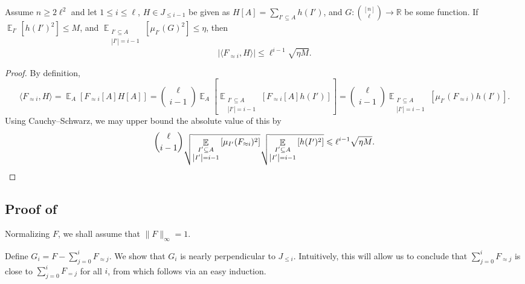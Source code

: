\documentclass{toc}
\newcommand\card[1]{\left| {#1} \right|}
\newcommand\Expect[2]{{\mathop{\mathbb{E}}_{#1}\left[ {#2} \right]}}
\newcommand\norm[1]{\| #1 \|}
\newcommand\inner[2]{\langle{#1},{#2}\rangle}
\renewcommand\geq{\geqslant}
\renewcommand\leq{\leqslant}
\newcommand\lvlfn[2]{{#1}_{={#2}}}
\newcommand\approxlvlfn[2]{{#1}_{\approx{#2}}}
\begin{document}
\begin{claim}\label{claim:approx_almost_ortho}
  Assume $n\geq 2\ell^2$ and let $1\leq i\leq \ell$, $H\in J_{\leq i-1}$ be given as $H[A] = \sum\limits_{I'\subseteq A} h(I')$,
  and $G\colon \binom{[n]}{\ell}\to\mathbb{R}$ be some function. If $\Expect{I'}{h(I')^2}\leq M$, and
  $\Expect{\substack{I'\subseteq A\\ \card{I'} = i-1}}{\mu_{I'}(G)^2}\leq \eta$, then
  \[
  \card{\inner{\approxlvlfn{F}{i}}{H}}\leq \ell^{i-1}\sqrt{\eta M}.
  \]
\end{claim}
\begin{proof}
  By definition,
  \[
  \inner{\approxlvlfn{F}{i}}{H}
  =\Expect{A}{\approxlvlfn{F}{i}[A] H[A]}
  =\binom{\ell}{i-1}\Expect{A}{\Expect{\substack{I'\subseteq A\\ \card{I'} = i-1}}{\approxlvlfn{F}{i}[A]h(I')}}
  =\binom{\ell}{i-1}\Expect{\substack{I'\subseteq A\\ \card{I'} = i-1}}{\mu_{I'}(\approxlvlfn{F}{i})h(I')}.
  \]
  Using Cauchy--Schwarz, we may upper bound the absolute value of this by
  \[
  \binom{\ell}{i-1}
  \sqrt{\Expect{\substack{I'\subseteq A\\ \card{I'} = i-1}}{\mu_{I'}(\approxlvlfn{F}{i})^2}}
  \sqrt{\Expect{\substack{I'\subseteq A\\ \card{I'} = i-1}}{h(I')^2}}
  \leq \ell^{i-1}\sqrt{\eta M}.\qedhere
  \]
\end{proof}

\subsection{Proof of }  
\label{sec:proofofThm:approx}   %
Normalizing $F$, we shall assume that $\norm{F}_{\infty} = 1$.

Define $G_i = F - \sum\limits_{j=0}^{i} \approxlvlfn{F}{j}$. We show that $G_i$ is nearly perpendicular to $J_{\leq i}$. Intuitively, this will allow us to conclude that $\sum\limits_{j=0}^{i} \approxlvlfn{F}{j}$
is close to $\sum\limits_{j=0}^{i} \lvlfn{F}{j}$ for all $i$, from which  follows via an easy induction.
\end{document}
